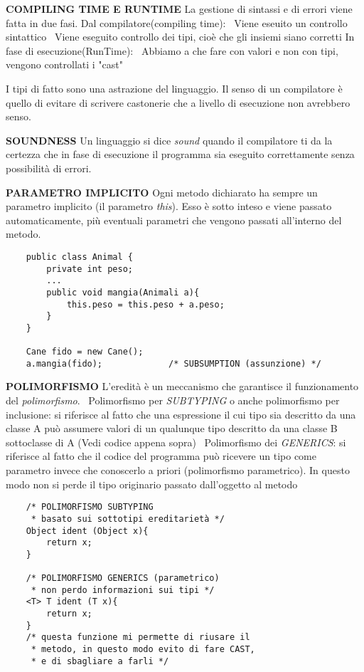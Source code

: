 \noindent \textbf{COMPILING TIME E RUNTIME} \newline
La gestione di sintassi e di errori viene fatta in due fasi.
Dal compilatore(compiling time): \newline
\textbullet\ Viene eseuito un controllo sintattico \newline
\textbullet\ Viene eseguito controllo dei tipi, cioè che gli insiemi siano corretti\newline
In fase di esecuzione(RunTime):\newline
\textbullet\ Abbiamo a che fare con valori e non con tipi, vengono controllati i "cast"

\noindent I tipi di fatto sono una astrazione del linguaggio. \newline
Il senso di un compilatore è quello di evitare di scrivere castonerie che a livello di esecuzione non avrebbero senso.

\noindent \textbf{SOUNDNESS} \newline
Un linguaggio si dice \textit{sound} quando il compilatore ti da la certezza che in fase di esecuzione il programma sia eseguito correttamente senza possibilità di errori.

\noindent \textbf{PARAMETRO IMPLICITO} \newline
 Ogni metodo dichiarato ha sempre un parametro implicito (il parametro \textit{this}). Esso è sotto inteso e viene passato automaticamente, più eventuali parametri che vengono passati all'interno del metodo.
\begin{lstlisting}
	public class Animal {
		private int peso;
		...
		public void mangia(Animali a){
			this.peso = this.peso + a.peso;
		}
	}
	
	Cane fido = new Cane();
	a.mangia(fido); 			/* SUBSUMPTION (assunzione)	*/
\end{lstlisting}

\noindent \textbf{POLIMORFISMO} \newline
L'eredità è un meccanismo che garantisce il funzionamento del \textit{polimorfismo}.\newline
\textbullet\ Polimorfismo per \textit{SUBTYPING} o anche polimorfismo per inclusione: si riferisce al fatto che una espressione il cui tipo sia descritto da una classe A può assumere valori di un qualunque tipo descritto da una classe B sottoclasse di A (Vedi codice appena sopra)\newline 
\textbullet\ Polimorfismo dei \textit{GENERICS}: si riferisce al fatto che il codice del programma può ricevere un tipo come parametro invece che conoscerlo a priori (polimorfismo parametrico). In questo modo non si perde il tipo originario passato dall'oggetto al metodo \newline
\begin{lstlisting}
	/* POLIMORFISMO SUBTYPING
	 * basato sui sottotipi ereditarietà */
	Object ident (Object x){
		return x;
	}

	/* POLIMORFISMO GENERICS (parametrico)
	 * non perdo informazioni sui tipi */
	<T> T ident (T x){
		return x;
	}
	/* questa funzione mi permette di riusare il 
	 * metodo, in questo modo evito di fare CAST,
	 * e di sbagliare a farli */
\end{lstlisting}

\newpage

